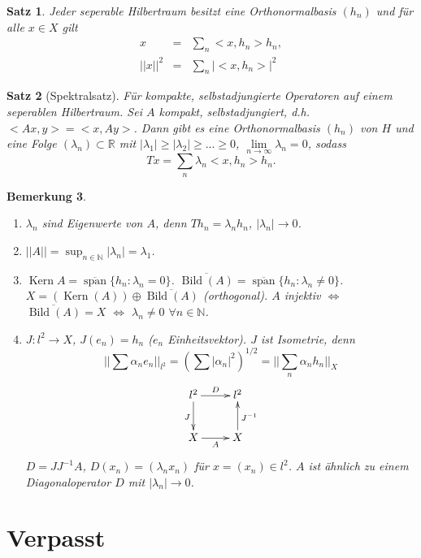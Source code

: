 \documentclass[12pt]{extreport} %
\newtheorem{Satz}{Satz}[subsection]
\newtheorem{Bemerkung}[Satz]{Bemerkung}
\DeclareMathOperator{\Kern}{Kern}
\DeclareMathOperator{\Bild}{Bild}
\DeclareMathOperator{\spann}{span}
\numberwithin{equation}{section}
\newcommand{\R}{\mathbb{R}} %
\newcommand{\N}{\mathbb{N}} %
\begin{document}
	\begin{Satz}
		Jeder seperable Hilbertraum besitzt eine Orthonormalbasis $(h_n)$ und für alle $x\in X$ gilt
		\begin{eqnarray}
			x &=& \sum_n <x,h_n>h_n,\nonumber\\
			||x||^2 &=& \sum_n|<x,h_n>|^2 \nonumber
		\end{eqnarray}	
	\end{Satz}
	
	\begin{Satz}[Spektralsatz]
		Für kompakte, selbstadjungierte Operatoren auf einem seperablen Hilbertraum.
		Sei $A$ kompakt, selbstadjungiert, d.h. $<Ax, y> = <x, Ay>$. Dann gibt es eine Orthonormalbasis $(h_n)$ von $H$ und eine Folge $(\lambda_n)\subset\R$ mit $|\lambda_1|\geq |\lambda_2|\geq...\geq 0$, $\lim\limits_{n\rightarrow\infty} \lambda_n = 0$, sodass
		$$ Tx= \sum_n \lambda_n<x,h_n>h_n.$$
	\end{Satz}
	
	\begin{Bemerkung}~
		\begin{enumerate}
			\item[a)] $\lambda_n$ sind Eigenwerte von $A$, denn $Th_n = \lambda_nh_n$, $|\lambda_n|\rightarrow 0$.
			\item[b)] $||A|| = \sup_{n\in \N}|\lambda_n| = \lambda_1$.
			\item[c)] $\Kern A = \overline{\spann}\{h_n:\lambda_n = 0 \}$. $\overline{\Bild(A)} = \overline{\spann}\{h_n: \lambda_n\neq 0\}$. $X = (\Kern(A))\oplus\overline{\Bild(A)}$ (orthogonal). $A$ injektiv $\Leftrightarrow$ $\overline{\Bild(A)} = X$ $\Leftrightarrow$ $\lambda_n \neq 0$ $\forall n\in \N$.
			\item[d)] $J:l^2\rightarrow X$, $J(e_n) = h_n$ ($e_n$ Einheitsvektor). $J$ ist Isometrie, denn
			$$||\sum \alpha_n e_n||_{l^2} = (\sum |\alpha_n|^2)^{1/2} = ||\sum_n \alpha_n h_n||_X$$
			$$\xymatrix{
				l^2\ar[r]^D \ar[d]_J & l^2\\
				X\ar[r]_A & X\ar[u]_{J^{-1}}
				}$$
			$D = JJ^{-1}A$, $D(x_n) = (\lambda_n x_n)$ für $x= (x_n) \in l^2$. $A$ ist ähnlich zu einem Diagonaloperator $D$ mit $|\lambda_n|\rightarrow 0$.
		\end{enumerate}
	\end{Bemerkung}
	
	\section{Verpasst}
	
\end{document}

